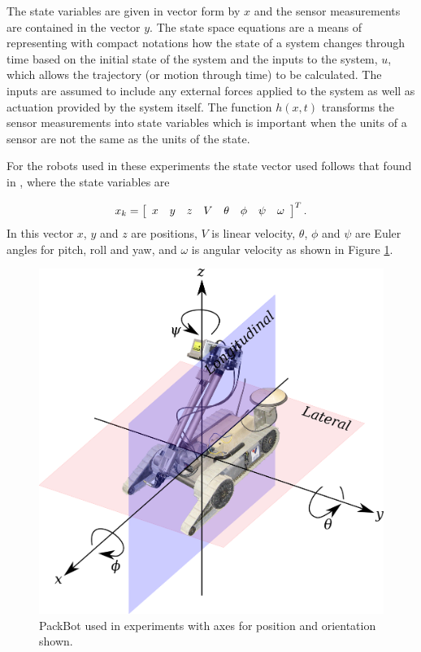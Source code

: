 The state variables are given in vector form by $x$ and the sensor measurements are contained in the vector $y$. The state space equations are a means of representing with compact notations how the state of a system changes through time based on the initial state of the system and the inputs to the system, $u$, which allows the trajectory (or motion through time) to be calculated. The inputs are assumed to include any external forces applied to the system as well as actuation provided by the system itself. The function $h(x,t)$ transforms the sensor measurements into state variables which is important when the units of a sensor are not the same as the units of the state.

For the robots used in these experiments the state vector used follows that found in \cite{Kelly_1994_338}, \cite{Kelly_1994_333} where the state variables are

\begin{align*}
x_k = \left[\begin{array}{c c c c c c c c} x & y & z & V & \theta & \phi & \psi & \omega \end{array}\right]^T.
\end{align*}
In this vector $x$, $y$ and $z$ are positions, $V$ is linear velocity, $\theta$, $\phi$ and $\psi$ are Euler angles for pitch, roll and yaw, and $\omega$ is angular velocity as shown in Figure \ref{fig:packbotaxes}.

\begin{figure}[ht!]
    \centering
    \includegraphics[width=.8\textwidth]{images/packbotaxes}
    \caption{PackBot used in experiments with axes for position and orientation shown.}
    \label{fig:packbotaxes}
\end{figure}

